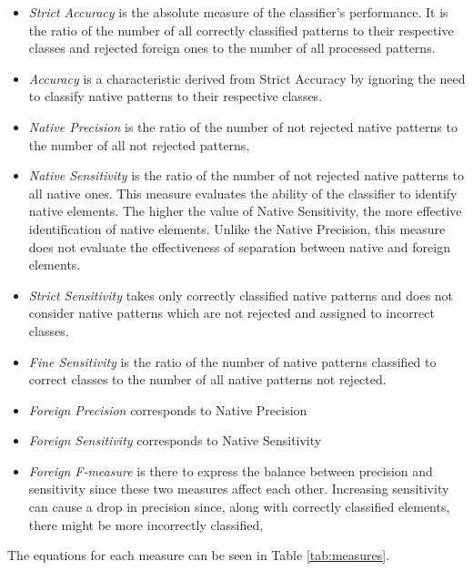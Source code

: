 \begin{itemize}
	\item \emph{Strict Accuracy} is the absolute measure of the classifier's performance. It is the ratio of the number of all correctly classified patterns to their respective classes and rejected foreign ones to the number of all processed patterns.
	\item \emph{Accuracy} is a characteristic derived from Strict Accuracy by ignoring the need to classify native patterns to their respective classes.
	\item \emph{Native Precision} is the ratio of the number of not rejected native patterns to the number of all not rejected patterns,
	\item \emph{Native Sensitivity} is the ratio of the number of not rejected native patterns to all native ones. This measure evaluates the ability of the classifier to identify native elements. The higher the value of Native Sensitivity, the more effective identification of native elements. Unlike the Native Precision, this measure does not evaluate the effectiveness of separation between native and foreign elements.
	\item \emph{Strict Sensitivity} takes only correctly classified native patterns and does not consider native patterns which are not rejected and assigned to incorrect classes.
	\item \emph{Fine Sensitivity} is the ratio of the number of native patterns classified to correct classes to the number of all native patterns not rejected.
	\item \emph{Foreign Precision} corresponds to Native Precision
	\item \emph{Foreign Sensitivity} corresponds to Native Sensitivity
	\item \emph{Foreign F-measure} is there to express the balance between precision and sensitivity since these two measures affect each other. Increasing sensitivity can cause a drop in precision since, along with correctly classified elements, there might be more incorrectly classified,
\end{itemize}

The equations for each measure can be seen in Table \ref{tab:measures}.

